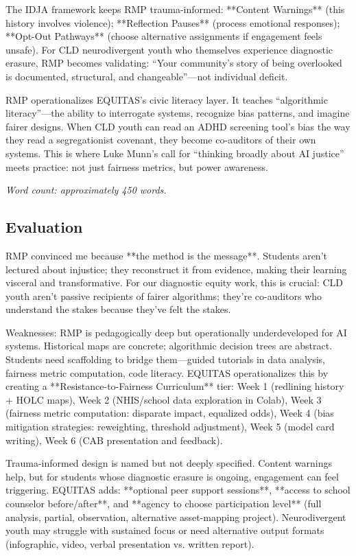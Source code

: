 \documentclass[12pt,twoside]{article}
\begin{document}
The IDJA framework keeps RMP trauma-informed: **Content Warnings** (this history involves violence); **Reflection Pauses** (process emotional responses); **Opt-Out Pathways** (choose alternative assignments if engagement feels unsafe). For CLD neurodivergent youth who themselves experience diagnostic erasure, RMP becomes validating: ``Your community's story of being overlooked is documented, structural, and changeable''—not individual deficit.

RMP operationalizes EQUITAS's civic literacy layer. It teaches ``algorithmic literacy''---the ability to interrogate systems, recognize bias patterns, and imagine fairer designs. When CLD youth can read an ADHD screening tool's bias the way they read a segregationist covenant, they become co-auditors of their own systems. This is where Luke Munn's call for ``thinking broadly about AI justice'' meets practice: not just fairness metrics, but power awareness.

\emph{Word count: approximately 450 words.}

\subsection*{Evaluation}

RMP convinced me because **the method is the message**. Students aren't lectured about injustice; they reconstruct it from evidence, making their learning visceral and transformative. For our diagnostic equity work, this is crucial: CLD youth aren't passive recipients of fairer algorithms; they're co-auditors who understand the stakes because they've felt the stakes.

Weaknesses: RMP is pedagogically deep but operationally underdeveloped for AI systems. Historical maps are concrete; algorithmic decision trees are abstract. Students need scaffolding to bridge them—guided tutorials in data analysis, fairness metric computation, code literacy. EQUITAS operationalizes this by creating a **Resistance-to-Fairness Curriculum** tier: Week 1 (redlining history + HOLC maps), Week 2 (NHIS/school data exploration in Colab), Week 3 (fairness metric computation: disparate impact, equalized odds), Week 4 (bias mitigation strategies: reweighting, threshold adjustment), Week 5 (model card writing), Week 6 (CAB presentation and feedback).

Trauma-informed design is named but not deeply specified. Content warnings help, but for students whose diagnostic erasure is ongoing, engagement can feel triggering. EQUITAS adds: **optional peer support sessions**, **access to school counselor before/after**, and **agency to choose participation level** (full analysis, partial, observation, alternative asset-mapping project). Neurodivergent youth may struggle with sustained focus or need alternative output formats (infographic, video, verbal presentation vs. written report).
\end{document}
